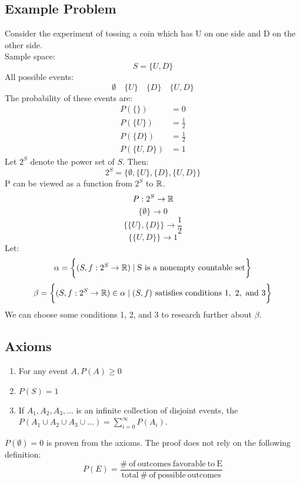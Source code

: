 \documentclass[letterpaper, 12pt]{math}
\begin{document}
\subsection*{Example Problem}
Consider the experiment of tossing a coin which has U on one side and D on the
other side. \\
Sample space:
\[ S = \bigg\{ U, D \bigg\} \]
All possible events:
\[ \emptyset \quad \bigg\{ U \bigg\} \quad \bigg\{ D \bigg\} \quad
   \bigg\{ U, D \bigg\} \]
The probability of these events are:
\begin{align*}
  P(\{ \}) &= 0 \\
  P(\{ U \}) &= \frac{1}{2} \\
  P(\{ D \}) &= \frac{1}{2} \\
  P(\{ U, D \}) &= 1
\end{align*}
Let \( 2^{S} \) denote the power set of \( S \). Then:
\[ 2^{S} = \bigg\{ \emptyset, \{ U \}, \{ D \}, \{ U, D \} \bigg\} \]
P can be viewed as a function from \( 2^{S} \) to \( \mathbb{R} \).
\[ P:2^{S} \to \mathbb{R} \]
\[ \bigg\{ \emptyset \bigg\} \to 0 \]
\[ \bigg\{ \{ U \}, \{ D \} \bigg\} \to \frac{1}{2} \]
\[ \bigg\{ \{ U, D \} \bigg\} \to 1 \]
Let:
\[ \alpha = \bigg\{ (S, f:2^{S} \to \mathbb{R}) \mid \mathrm{S\ is\ a\ nonempty\
   countable\ set} \bigg\} \]
\[ \beta = \bigg\{(S, f:2^{S} \to \mathbb{R}) \in \alpha \mid (S, f)
   \mathrm{\ satisfies\ conditions\ 1,\ 2,\ and\ 3} \bigg\} \]
We can choose some conditions 1, 2, and 3 to research further about
\( \beta \).

\subsection*{Axioms}
\begin{enumerate}
  \item For any event \( A, P(A) \geq 0 \)
  \item \( P(S) = 1 \)
  \item If \( A_{1}, A_{2}, A_{3}, \dots \) is an infinite collection of
    disjoint events, the \( P(A_{1} \cup A_{2} \cup A_{3} \cup \dots) =
    \sum_{i=0}^{\infty}P(A_{i}) \).
\end{enumerate}
\( P(\emptyset) = 0 \) is proven from the axioms. The proof does not rely on
the following definition:
\[ P(E) = \frac{\mathrm{\#\ of\ outcomes\ favorable\ to\ E}}
   {\mathrm{total\ \#\ of\ possible\ outcomes}} \]
\end{document}

